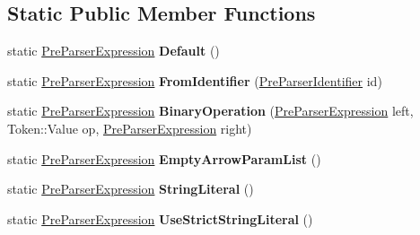 \subsection*{Static Public Member Functions}
\begin{DoxyCompactItemize}
\item 
\hypertarget{classv8_1_1internal_1_1_pre_parser_expression_aac26f7ed92596ab9c1ebd6a725ca006f}{}static \hyperlink{classv8_1_1internal_1_1_pre_parser_expression}{Pre\+Parser\+Expression} {\bfseries Default} ()\label{classv8_1_1internal_1_1_pre_parser_expression_aac26f7ed92596ab9c1ebd6a725ca006f}

\item 
\hypertarget{classv8_1_1internal_1_1_pre_parser_expression_a094ce423be74c322228d6c1e05e1499a}{}static \hyperlink{classv8_1_1internal_1_1_pre_parser_expression}{Pre\+Parser\+Expression} {\bfseries From\+Identifier} (\hyperlink{classv8_1_1internal_1_1_pre_parser_identifier}{Pre\+Parser\+Identifier} id)\label{classv8_1_1internal_1_1_pre_parser_expression_a094ce423be74c322228d6c1e05e1499a}

\item 
\hypertarget{classv8_1_1internal_1_1_pre_parser_expression_a5bc38e6a3ad74797e513971dda06750d}{}static \hyperlink{classv8_1_1internal_1_1_pre_parser_expression}{Pre\+Parser\+Expression} {\bfseries Binary\+Operation} (\hyperlink{classv8_1_1internal_1_1_pre_parser_expression}{Pre\+Parser\+Expression} left, Token\+::\+Value op, \hyperlink{classv8_1_1internal_1_1_pre_parser_expression}{Pre\+Parser\+Expression} right)\label{classv8_1_1internal_1_1_pre_parser_expression_a5bc38e6a3ad74797e513971dda06750d}

\item 
\hypertarget{classv8_1_1internal_1_1_pre_parser_expression_ab3abbf1f175a2b9b9b72458df7993014}{}static \hyperlink{classv8_1_1internal_1_1_pre_parser_expression}{Pre\+Parser\+Expression} {\bfseries Empty\+Arrow\+Param\+List} ()\label{classv8_1_1internal_1_1_pre_parser_expression_ab3abbf1f175a2b9b9b72458df7993014}

\item 
\hypertarget{classv8_1_1internal_1_1_pre_parser_expression_ab9f3abe6a770ea41fbb8987efe7c38b9}{}static \hyperlink{classv8_1_1internal_1_1_pre_parser_expression}{Pre\+Parser\+Expression} {\bfseries String\+Literal} ()\label{classv8_1_1internal_1_1_pre_parser_expression_ab9f3abe6a770ea41fbb8987efe7c38b9}

\item 
\hypertarget{classv8_1_1internal_1_1_pre_parser_expression_a0b1ac7a277af49cdb2a1dace026b76a8}{}static \hyperlink{classv8_1_1internal_1_1_pre_parser_expression}{Pre\+Parser\+Expression} {\bfseries Use\+Strict\+String\+Literal} ()\label{classv8_1_1internal_1_1_pre_parser_expression_a0b1ac7a277af49cdb2a1dace026b76a8}


\end{DoxyCompactItemize}
